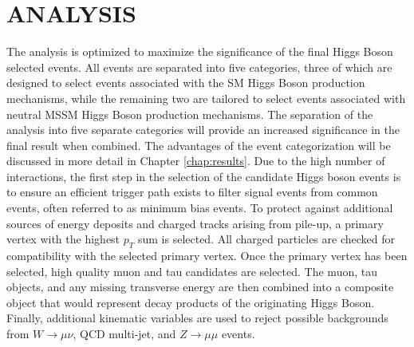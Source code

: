 \chapter{ANALYSIS}
\label{chap:analysis}
The analysis is optimized to maximize the significance of the final Higgs Boson selected events. 
All events are separated into five categories, three of which are designed to select events associated with the SM Higgs Boson production mechanisms, while the remaining two are tailored to select events associated with neutral MSSM Higgs Boson production mechanisms. 
The separation of the analysis into five separate categories will provide an increased significance in the final result when combined. 
The advantages of the event categorization will be discussed in more detail in Chapter \ref{chap:results}.
Due to the high number of interactions, the first step in the selection of the candidate Higgs boson events is to ensure an efficient trigger path exists to filter signal events from common events, often referred to as minimum bias events.
To protect against additional sources of energy deposits and charged tracks arising from pile-up, a primary vertex with the highest $p_{T}$ sum is selected. 
All charged particles are checked for compatibility with the selected primary vertex.
Once the primary vertex has been selected, high quality muon and tau candidates are selected.
The muon, tau objects, and any missing transverse energy are then combined into a composite object that would represent decay products of the originating Higgs Boson.
Finally, additional kinematic variables are used to reject possible backgrounds from $W \rightarrow \mu \nu$, QCD multi-jet, and $Z\rightarrow\mu\mu$ events.






